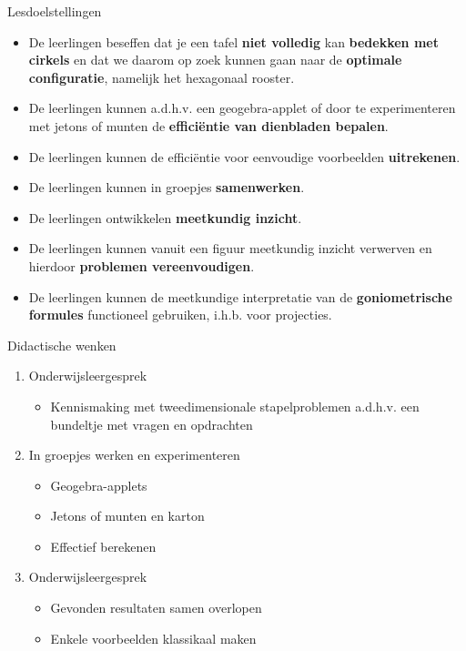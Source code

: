 \documentclass[dutch]{beamer}
\begin{document}
\begin{frame}{Lesdoelstellingen}
\begin{itemize}
\item De leerlingen beseffen dat je een tafel \textbf{niet volledig} kan \textbf{bedekken met cirkels} en dat we daarom op zoek kunnen gaan naar de \textbf{optimale configuratie}, namelijk het hexagonaal rooster.
\item De leerlingen kunnen a.d.h.v. een geogebra-applet of door te experimenteren met jetons of munten de \textbf{effici\"{e}ntie van dienbladen bepalen}.
\item De leerlingen kunnen de effici\"{e}ntie voor eenvoudige voorbeelden \textbf{uitrekenen}.
\item De leerlingen kunnen in groepjes \textbf{samenwerken}.
\item De leerlingen ontwikkelen \textbf{meetkundig inzicht}.
\item De leerlingen kunnen vanuit een figuur meetkundig inzicht verwerven en hierdoor \textbf{problemen vereenvoudigen}.
\item De leerlingen kunnen de meetkundige interpretatie van de \textbf{goniometrische formules} functioneel gebruiken, i.h.b. voor projecties.
\end{itemize}
\end{frame}

\begin{frame}{Didactische wenken}

\begin{enumerate}
	\item Onderwijsleergesprek
	\begin{itemize}
	\item Kennismaking met tweedimensionale stapelproblemen a.d.h.v. een bundeltje met vragen en opdrachten
\end{itemize}
	
	\item In groepjes werken en experimenteren 
	\begin{itemize}
	\item Geogebra-applets
	\item Jetons of munten en karton
	\item Effectief berekenen
\end{itemize}

  \item Onderwijsleergesprek
  \begin{itemize}
	\item Gevonden resultaten samen overlopen
	\item Enkele voorbeelden klassikaal maken
\end{itemize}
\end{enumerate}
\end{frame}
\end{document}
